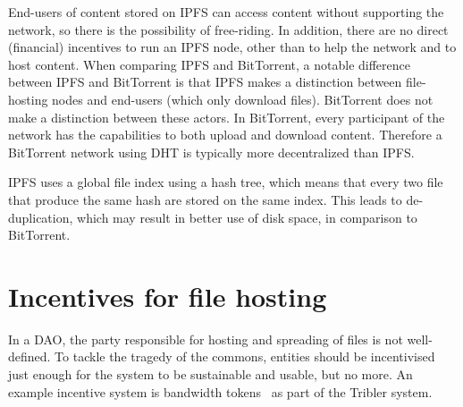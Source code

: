 End-users of content stored on IPFS can access content without supporting the network, so there is the possibility of free-riding. In addition, there are no direct (financial) incentives to run an IPFS node, other than to help the network and to host content. 
When comparing IPFS and BitTorrent, a notable difference between IPFS and BitTorrent is that IPFS makes a distinction between file-hosting nodes and end-users (which only download files). BitTorrent does not make a distinction between these actors. In BitTorrent, every participant of the network has the capabilities to both upload and download content. Therefore a BitTorrent network using DHT is typically more decentralized than IPFS. 

IPFS uses a global file index using a hash tree, which means that every two file that produce the same hash are stored on the same index. This leads to de-duplication, which may result in better use of disk space, in comparison to BitTorrent.



\section{Incentives for file hosting}
\label{sec:file-spreading-incentives}
In a DAO, the party responsible for hosting and spreading of files is not well-defined. To tackle the tragedy of the commons, entities should be incentivised just enough for the system to be sustainable and usable, but no more. An example incentive system is bandwidth tokens~\citep{de2018blockchain} as part of the Tribler system.


